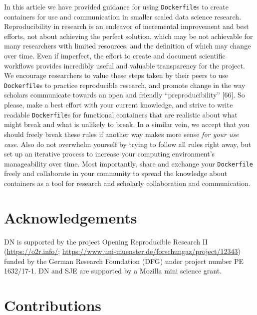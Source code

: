 \documentclass[10pt,letterpaper]{article}
\begin{document}
In this article we have provided guidance for using \texttt{Dockerfile}s
to create containers for use and communication in smaller scaled data
science research. Reproducibility in research is an endeavor of
incremental improvement and best efforts, not about achieving the
perfect solution, which may be not achievable for many researchers with
limited resources, and the definition of which may change over time.
Even if imperfect, the effort to create and document scientific
workflows provides incredibly useful and valuable transparency for the
project. We encourage researchers to value these steps taken by their
peers to use \texttt{Dockerfile}s to practice reproducible research, and
promote change in the way scholars communicate towards an open and
friendly ``preproducibility'' {[}66{]}. So please, make a best effort
with your current knowledge, and strive to write readable
\texttt{Dockerfile}s for functional containers that are realistic about
what might break and what is unlikely to break. In a similar vein, we
accept that you should freely break these rules if another way makes
more sense \emph{for your use case}. Also do not overwhelm yourself by
trying to follow all rules right away, but set up an iterative process
to increase your computing environment's manageability over time. Most
importantly, share and exchange your \texttt{Dockerfile} freely and
collaborate in your community to spread the knowledge about containers
as a tool for research and scholarly collaboration and communication.

\hypertarget{acknowledgements}{%
\section*{Acknowledgements}\label{acknowledgements}}

DN is supported by the project Opening Reproducible Research II
(\href{https://o2r.info/}{https://o2r.info/};
\href{https://www.uni-muenster.de/forschungaz/project/12343}{https://www.uni-muenster.de/forschungaz/project/12343})
funded by the German Research Foundation (DFG) under project number PE
1632/17-1. DN and SJE are supported by a Mozilla mini science grant.

\hypertarget{contributions}{%
\section*{Contributions}\label{contributions}}
\end{document}
